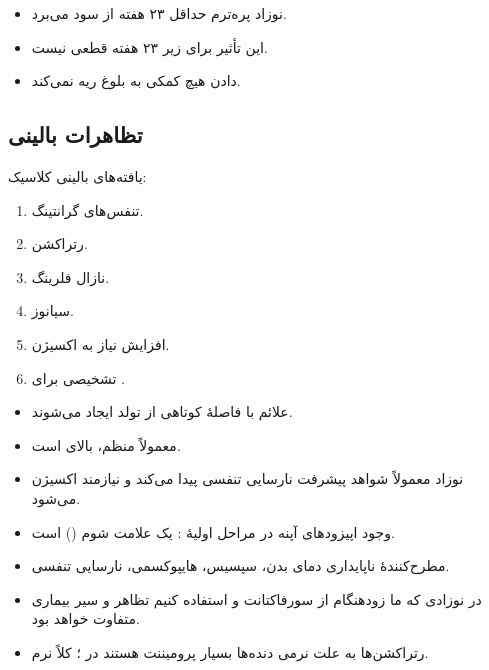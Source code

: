 \documentclass[12pt,a4paper]{article}
\begin{document}
\begin{itemize}
\item نوزاد پره‌ترم حداقل ۲۳ هفته از  سود می‌برد.
\item این تأثیر برای زیر ۲۳ هفته قطعی نیست.
\item دادن  هیچ کمکی به بلوغ ریه نمی‌کند.
\end{itemize}
\subsection*{تظاهرات بالینی }
یافته‌های بالینی کلاسیک:
\begin{enumerate}
\item تنفس‌های گرانتینگ.
\item رتراکشن.
\item نازال فلرینگ.
\item سیانوز.
\item افزایش نیاز به اکسیژن.
\item {} تشخیصی برای .
\end{enumerate}
\begin{itemize}
\item علائم با فاصلهٔ کوتاهی از تولد ایجاد می‌شوند.
\item {} معمولاً منظم، بالای  است.
\item نوزاد معمولاً شواهد پیشرفت نارسایی تنفسی پیدا می‌کند و نیازمند اکسیژن می‌شود.
\item وجود اپیزودهای آپنه در مراحل اولیهٔ : یک علامت شوم () است.
\item مطرح‌کنندهٔ ناپایداری دمای بدن، سپسیس، هایپوکسمی، نارسایی تنفسی.
\item در نوزادی که ما زودهنگام از سورفاکتانت و  استفاده کنیم تظاهر و سیر بیماری متفاوت خواهد بود.
\item رتراکشن‌ها به علت نرمی دنده‌ها بسیار پرومیننت هستند در ؛ کلاً نرم.
\end{itemize}
\end{document}
